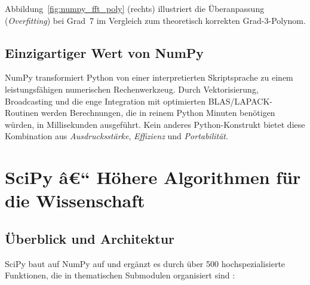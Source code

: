 \documentclass[12pt, a4paper]{article}
\begin{document}
Abbildung~\ref{fig:numpy_fft_poly} (rechts) illustriert die Überanpassung
(\emph{Overfitting}) bei Grad~7 im Vergleich zum theoretisch korrekten
Grad-3-Polynom.

\subsection{Einzigartiger Wert von NumPy}

NumPy transformiert Python von einer interpretierten Skriptsprache zu
einem leistungsfähigen numerischen Rechenwerkzeug. Durch Vektorisierung,
Broadcasting und die enge Integration mit optimierten BLAS/LAPACK-Routinen
werden Berechnungen, die in reinem Python Minuten benötigen würden, in
Millisekunden ausgeführt. Kein anderes Python-Konstrukt bietet diese
Kombination aus \emph{Ausdrucksstärke}, \emph{Effizienz} und
\emph{Portabilität}.

\section{SciPy â€“ Höhere Algorithmen für die Wissenschaft}
\label{sec:scipy}

\subsection{Überblick und Architektur}
\label{subsec:scipy-overview}

SciPy baut auf NumPy auf und ergänzt es durch über 500 hochspezialisierte
Funktionen, die in thematischen Submodulen organisiert sind
\cite{virtanen2020scipy}:
\end{document}
